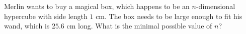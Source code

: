 Merlin wants to buy a magical box, which happens to be an $n$-dimensional hypercube with side length $1$ cm.
The box needs to be large enough to fit his wand, which is $25.6$ cm long.
What is the minimal possible value of $n$?
